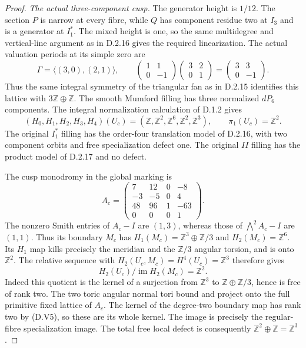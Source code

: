 \begin{proof}
\emph{The actual three-component cusp.}
The generator height is $1/12$. The section $P$ is narrow
at every fibre, while $Q$ has component residue two at
$I_3$ and is a generator at $I_1^*$. The mixed height is
one, so the same multidegree and vertical-line argument
as in D.2.16 gives the required linearization.
The actual valuation periods at its simple zero are
\[
 \Gamma=\langle(3,0),(2,1)\rangle,
 \qquad
 \begin{pmatrix}1&1\\0&-1\end{pmatrix}
 \begin{pmatrix}3&2\\0&1\end{pmatrix}
       =\begin{pmatrix}3&3\\0&-1\end{pmatrix}.
 \tag{D.V4}
\]
Thus the same integral symmetry of the triangular fan as
in D.2.15 identifies this lattice with
$3\mathbb Z\oplus\mathbb Z$. The smooth Mumford filling
has three normalized $dP_6$ components. The integral
normalization calculation of D.1.2 gives
\[
 (H_0,H_1,H_2,H_3,H_4)(U_c)
  =(\mathbb Z,\mathbb Z^2,\mathbb Z^6,\mathbb Z^2,\mathbb Z^3),
 \qquad \pi_1(U_c)=\mathbb Z^2.
\]
The original $I_1^*$ filling has the order-four translation
model of D.2.16, with two component orbits and free
specialization defect one. The original $II$ filling has
the product model of D.2.17 and no defect.

The cusp monodromy in the global marking is
\[
 A_c=\begin{pmatrix}
 7&12&0&-8\\-3&-5&0&4\\48&96&1&-63\\0&0&0&1
 \end{pmatrix}.
\]
The nonzero Smith entries of $A_c-I$ are $(1,3)$,
whereas those of $\bigwedge^2A_c-I$ are $(1,1)$.
Thus its boundary $M_c$ has
$H_1(M_c)=\mathbb Z^3\oplus\mathbb Z/3$ and
$H_2(M_c)=\mathbb Z^6$.
Its $H_1$ map kills precisely the meridian and the
$\mathbb Z/3$ angular torsion, and is onto $\mathbb Z^2$.
The relative sequence with
$H_2(U_c,M_c)=H^4(U_c)=\mathbb Z^3$ therefore gives
\[
 H_2(U_c)/\operatorname{im}H_2(M_c)=\mathbb Z^2.
 \tag{D.V5}
\]
Indeed this quotient is the kernel of a surjection from
$\mathbb Z^3$ to $\mathbb Z\oplus\mathbb Z/3$, hence is
free of rank two. The two toric angular normal tori bound
and project onto the full primitive fixed lattice of
$A_c$. The kernel of the degree-two boundary map has
rank two by (D.V5), so these are its whole kernel.
The image is precisely the regular-fibre specialization
image. The total free local defect is consequently
$\mathbb Z^2\oplus\mathbb Z=\mathbb Z^3$.


\end{proof}
